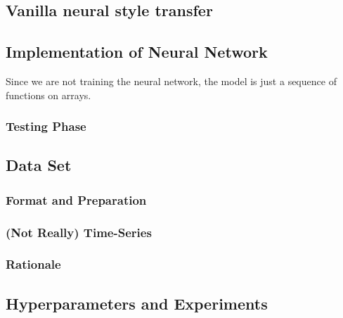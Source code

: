 \documentclass[runningheads]{llncs}
\begin{document}
\subsection{Vanilla neural style transfer}

\subsection{Implementation of Neural Network}
Since we are not training the neural network, 
the model is just a sequence of functions on arrays.

\subsubsection{Testing Phase}

\subsection{Data Set}

\subsubsection {Format and Preparation}

\subsubsection {(Not Really) Time-Series}

\subsubsection {Rationale}

\subsection{Hyperparameters and Experiments}
\end{document}

